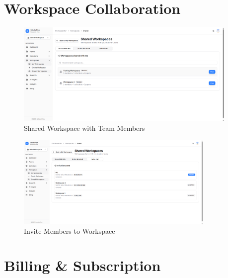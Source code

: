 \section{Workspace Collaboration}
\label{sec:screenshots-workspace}

\begin{figure}[H]
\centering
\includegraphics[width=0.95\textwidth]{images/screenshots/shared_workspace.png}
\caption{Shared Workspace with Team Members}
\label{fig:screenshot-shared-workspace}
\end{figure}

\begin{figure}[H]
\centering
\includegraphics[width=0.85\textwidth]{images/screenshots/workspace_invite.png}
\caption{Invite Members to Workspace}
\label{fig:screenshot-workspace-invite}
\end{figure}

\section{Billing \& Subscription}
\label{sec:screenshots-billing}

